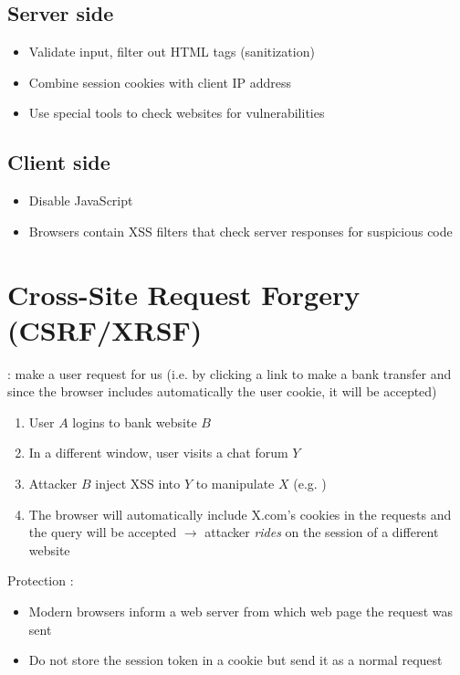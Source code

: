 \subsection{Server side}

\begin{itemize}
    \item Validate input, filter out HTML tags (sanitization)
    \item Combine session cookies with client IP address
    \item Use special tools to check websites for vulnerabilities
\end{itemize}

\subsection{Client side}

\begin{itemize}
    \item Disable JavaScript
    \item Browsers contain XSS filters that check server responses for suspicious code
\end{itemize}

\section{Cross-Site Request Forgery (CSRF/XRSF)}

 : make a user request for us (i.e. by clicking a link to make a bank transfer and since the browser includes automatically the user cookie, it will be accepted)

\begin{enumerate}
    \item User $A$ logins to bank website $B$
    \item In a different window, user visits a chat forum $Y$
    \item Attacker $B$ inject XSS into $Y$ to manipulate $X$ (e.g. )
    \item The browser will automatically include X.com's cookies in the requests and the query will be accepted $\rightarrow$ attacker \textit{rides} on the session of a different website
\end{enumerate}

Protection :
\begin{itemize}
    \item Modern browsers inform a web server from which web page the request was sent
    \item Do not store the session token in a cookie but send it as a normal request
\end{itemize}

